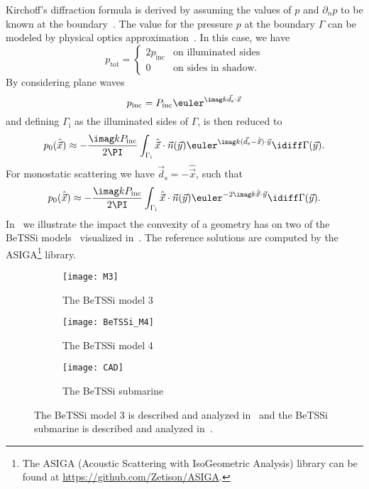 Kirchoff's diffraction formula is derived by assuming the values of $p$ and $\partial_n p$ to be known at the boundary~\cite{Fawcett2001moh}. The value for the pressure $p$ at the boundary $\Gamma$ can be modeled by physical optics approximation~\cite[p. 147]{Chandler_Wilde2012nab}. In this case, we have
\begin{equation*}
	p_{\mathrm{tot}} = \begin{cases} 2p_{\mathrm{inc}} & \text{on illuminated sides}\\
		0 & \text{on sides in shadow}.
		\end{cases}
\end{equation*}
By considering plane waves 
\begin{equation}\label{Eq4:PlaneWave}
	p_{\mathrm{inc}} = P_{\mathrm{inc}}\euler^{\imag k\vec{d}_{\mathrm{s}}\cdot \vec{x}}
\end{equation}
and defining $\Gamma_{\mathrm{i}}$ as the illuminated sides of $\Gamma$,  is then reduced to
\begin{equation}\label{Eq4:bistatic}
	p_0(\hat{\vec{x}}) \approx -\frac{\imag kP_{\mathrm{inc}}}{2\PI}\int_{\Gamma_{\mathrm{i}}} \hat{\vec{x}}\cdot\vec{n}(\vec{y}) \euler^{\imag k (\vec{d}_{\mathrm{s}} - \hat{\vec{x}})\cdot\vec{y}}\idiff \Gamma(\vec{y}).
\end{equation}
For monostatic scattering we have $\vec{d}_{\mathrm{s}} =- \hat{\vec{x}}$, such that
\begin{equation}\label{Eq4:monostatic}
	p_0(\hat{\vec{x}}) \approx -\frac{\imag kP_{\mathrm{inc}}}{2\PI}\int_{\Gamma_{\mathrm{i}}} \hat{\vec{x}}\cdot\vec{n}(\vec{y}) \euler^{-2\imag k \hat{\vec{x}}\cdot\vec{y}}\idiff \Gamma(\vec{y}).
\end{equation}
In~ we illustrate the impact the convexity of a geometry has on two of the BeTSSi models~\cite{Nolte2014bib} visualized in~. The reference solutions are computed by the ASIGA\footnote{The ASIGA (Acoustic Scattering with IsoGeometric Analysis) library can be found at \href{https://github.com/Zetison/ASIGA}{https://github.com/Zetison/ASIGA}.} library.
\begin{figure}
	\centering
	\begin{subfigure}{0.7\textwidth}
		\centering
		\texttt{[image: M3]} %
		\caption{The BeTSSi model 3}
	\end{subfigure}%
	\begin{subfigure}{0.3\textwidth}
		\centering
		\texttt{[image: BeTSSi\_M4]}
		\caption{The BeTSSi model 4}
	\end{subfigure}
	\par\bigskip
	\par\bigskip
	\begin{subfigure}{\textwidth}
		\centering
		\texttt{[image: CAD]}
		\caption{The BeTSSi submarine}
	\end{subfigure}
	\caption{The BeTSSi model 3 is described and analyzed in~\cite{Venas2015iao} and the BeTSSi submarine is described and analyzed in~\cite{Venas2019ibe}.}
	\label{Fig4:BeTSSiModels}
\end{figure}
